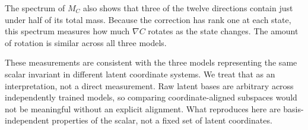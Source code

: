 The spectrum of $M_C$ also shows that three of the twelve directions contain just under half of its
total mass. Because the correction has rank one at each state, this spectrum measures how much
$\nabla C$ rotates as the state changes. The amount of rotation is similar across all three models.

These measurements are consistent with the three models representing the same scalar invariant in
different latent coordinate systems. We treat that as an interpretation, not a direct measurement.
Raw latent bases are arbitrary across independently trained models, so comparing coordinate-aligned
subspaces would not be meaningful without an explicit alignment. What reproduces here are
basis-independent properties of the scalar, not a fixed set of latent coordinates.
